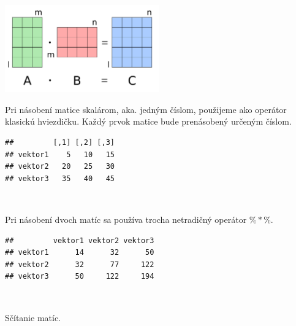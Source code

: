 \begin{center}

\includegraphics[width=0.5\textwidth,height=\textheight]{diplomka obrazky/4a.png}

\end{center}

Pri násobení matice skalárom, aka. jedným číslom, použijeme ako operátor
klasickú hviezdičku. Každý prvok matice bude prenásobený určeným číslom.

\begin{Shaded}
\begin{Highlighting}[]
\OperatorTok{*}\StringTok{ }
\end{Highlighting}
\end{Shaded}

\begin{verbatim}
##         [,1] [,2] [,3]
## vektor1    5   10   15
## vektor2   20   25   30
## vektor3   35   40   45
\end{verbatim}

~

Pri násobení dvoch matíc sa používa trocha netradičný operátor
\(\%*\%\).

\begin{Shaded}
\end{Shaded}

\begin{verbatim}
##         vektor1 vektor2 vektor3
## vektor1      14      32      50
## vektor2      32      77     122
## vektor3      50     122     194
\end{verbatim}

~

Sčítanie matíc.

\begin{Shaded}
\begin{Highlighting}[]
\OperatorTok{+}\StringTok{ }
\end{Highlighting}
\end{Shaded}

